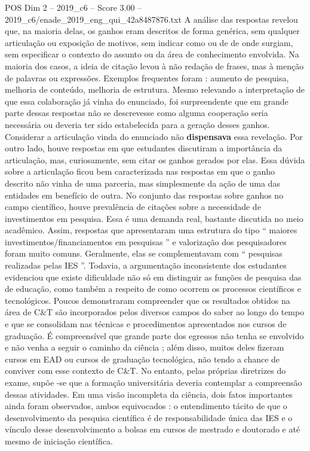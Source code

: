 \begin{textsample}{POS Dim 2 – 2019\_c6 – Score 3.00 – 2019\_c6/enade\_2019\_eng\_qui\_42a8487876.txt}
A análise das respostas revelou que, na maioria delas, os ganhos eram descritos de forma genérica, sem qualquer articulação ou exposição de motivos, sem indicar como ou de de onde surgiam, sem especificar o contexto do assunto ou da área de conhecimento envolvida.
Na maioria dos casos, a ideia de citação levou à não redação de frases, mas à menção de palavras ou expressões.
Exemplos frequentes foram : aumento de pesquisa, melhoria de conteúdo, melhoria de estrutura.
Mesmo relevando a interpretação de que essa colaboração já vinha do enunciado, foi surpreendente que em grande parte dessas respostas não se descrevesse como alguma cooperação seria necessária ou deveria ter sido estabelecida para a geração desses ganhos.
Considerar a articulação vinda do enunciado não \textbf{dispensava} essa revelação.
Por outro lado, houve respostas em que estudantes discutiram a importância da articulação, mas, curiosamente, sem citar os ganhos gerados por elas.
Essa dúvida sobre a articulação ficou bem caracterizada nas respostas em que o ganho descrito não vinha de uma parceria, mas simplesmente da ação de uma das entidades em benefício de outra.
No conjunto das respostas sobre ganhos no campo científico, houve prevalência de citações sobre a necessidade de investimentos em pesquisa.
Essa é uma demanda real, bastante discutida no meio acadêmico.
Assim, respostas que apresentaram uma estrutura do tipo “ maiores investimentos/financiamentos em pesquisas ” e valorização dos pesquisadores foram muito comuns.
Geralmente, elas se complementavam com “ pesquisas realizadas pelas IES ”.
Todavia, a argumentação inconsistente dos estudantes evidenciou que existe dificuldade não só em distinguir as funções de pesquisa das de educação, como também a respeito de como ocorrem os processos científicos e tecnológicos.
Poucos demonstraram compreender que os resultados obtidos na área de C\&T são incorporados pelos diversos campos do saber ao longo do tempo e que se consolidam nas técnicas e procedimentos apresentados nos cursos de graduação.
É compreensível que grande parte dos egressos não tenha se envolvido e não venha a seguir o caminho da ciência ; além disso, muitos deles fizeram cursos em EAD ou cursos de graduação tecnológica, não tendo a chance de conviver com esse contexto de C\&T.
No entanto, pelas próprias diretrizes do exame, supõe -se que a formação universitária deveria contemplar a compreensão dessas atividades.
Em uma visão incompleta da ciência, dois fatos importantes ainda foram observados, ambos equivocados : o entendimento tácito de que o desenvolvimento da pesquisa científica é de responsabilidade única das IES e o vínculo desse desenvolvimento a bolsas em cursos de mestrado e doutorado e até mesmo de iniciação científica.

\end{textsample}

